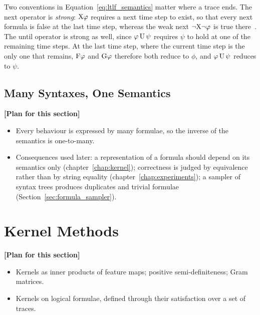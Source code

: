 \documentclass[titlepage,a4paper,11pt]{report}
\newenvironment{RSnewblock}{\par\color{blue!65!black}}{\par}
\newenvironment{RSplan}{\par\medskip\color{orange!85!black}\noindent\textbf{[Plan for this section]}\par}{\par\medskip}
\begin{document}
\begin{RSnewblock}
    Two conventions in Equation~\eqref{eq:ltlf_semantics} matter where a trace ends. The next operator is \emph{strong}: $\text{X}\varphi$ requires a next time step to exist, so that every next formula is false at the last time step, whereas the weak next $\neg\text{X}\neg\varphi$ is true there~\citep{de_giacomo_linear_2013}. The until operator is strong as well, since $\varphi\,\text{U}\,\psi$ requires $\psi$ to hold at one of the remaining time steps. At the last time step, where the current time step is the only one that remains, $\text{F}\varphi$ and $\text{G}\varphi$ therefore both reduce to $\phi$, and $\varphi\,\text{U}\,\psi$ reduces to $\psi$.
    \end{RSnewblock}


    \subsection{Many Syntaxes, One Semantics}\label{sec:many_syntaxes}
    \begin{RSplan}
    \begin{itemize}
        \item Every behaviour is expressed by many formulae, so the inverse of the semantics is one-to-many.
        \item Consequences used later: a representation of a formula should depend on its semantics only (chapter~\ref{chap:kernel}); correctness is judged by equivalence rather than by string equality (chapter~\ref{chap:experiments}); a sampler of syntax trees produces duplicates and trivial formulae (Section~\ref{sec:formula_sampler}).
    \end{itemize}
    \end{RSplan}

    \section{Kernel Methods}\label{sec:kernel_methods}
    \begin{RSplan}
    \begin{itemize}
        \item Kernels as inner products of feature maps; positive semi-definiteness; Gram matrices.
        \item Kernels on logical formulae, defined through their satisfaction over a set of traces.
    \end{itemize}
    \end{RSplan}
\end{document}
